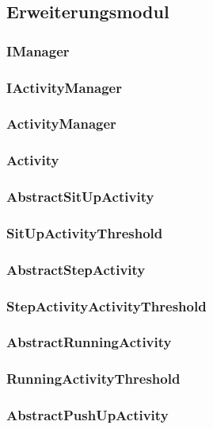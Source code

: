 \documentclass[a4paper,12pt]{article}
\begin{document}
\subsection{Erweiterungsmodul}
	\subsubsection{IManager}
	
	\subsubsection{IActivityManager}
	\subsubsection{ActivityManager}
	
	\subsubsection{Activity}
	
	\subsubsection{AbstractSitUpActivity}
	\subsubsection{SitUpActivityThreshold}
	
	\subsubsection{AbstractStepActivity}
	\subsubsection{StepActivityActivityThreshold}
	
	\subsubsection{AbstractRunningActivity}
	\subsubsection{RunningActivityThreshold}
	
	\subsubsection{AbstractPushUpActivity}
\end{document}
